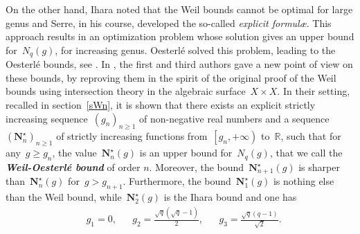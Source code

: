 \documentclass{amsart}
\newcommand{\R}{\mathbb{R}}
\newcommand{\OptimalNumber}{{\mathbf N}^\star}
\begin{document}
On the other hand, Ihara \cite{Ihara} noted that the Weil bounds cannot be optimal for large genus and Serre, in his course,
developed the so-called \emph{explicit formul\ae}.
This approach results in an optimization problem whose solution gives an upper bound for~$N_q(g)$, for increasing genus. Oesterl\'e solved this problem, leading to the Oesterl\'e bounds, see \cite[Chapter VI]{SerreRP}. 
In \cite{HP19}, the first and third authors gave a new point
of view on these bounds, by reproving them in the spirit of the original proof of the Weil bounds using intersection theory in the algebraic surface~$X\times X$. 
In their setting, recalled in section~\ref{sWn}, it is shown that there exists an explicit strictly increasing sequence~$(g_n)_{n\geq 1}$ of
non-negative real numbers and a sequence~$(\OptimalNumber_n)_{n\geq 1}$  of
strictly increasing functions from~$\left[g_n,+\infty\right)$ to~$\R$, such that for any~$g\geq g_n$, the value~$\OptimalNumber_n(g)$ is
an upper bound for~$N_q(g)$, that we call the {\bf\em Weil-Oesterl\'e bound} of order $n$. 
Moreover, the bound~$\OptimalNumber_{n+1}(g)$ is sharper than~$\OptimalNumber_n(g)$ for~$g > g_{n+1}$.
Furthermore, the bound~$\OptimalNumber_1(g)$ is nothing else than the Weil bound, while~$\OptimalNumber_2(g)$ is the Ihara bound \cite{Ihara}
and one has
\begin{align*}
&g_1=0,
&
&g_2 = \frac{\sqrt{q}\left(\sqrt{q}-1\right)}{2},
&
&g_3 = \frac{\sqrt{q}\left(q-1\right)}{\sqrt{2}}.
\end{align*}
\end{document}
